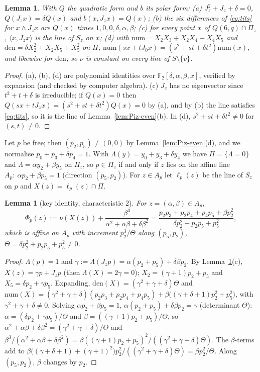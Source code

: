 \documentclass[11pt]{amsart}
\newtheorem{lemma}[theorem]{Lemma}
\theoremstyle{definition}
\theoremstyle{remark}
\numberwithin{equation}{section}
\newcommand{\F}{\mathbb F}
\begin{document}
\begin{lemma}\label{lem:Jz-even}
With $Q$ the quadratic form and $b$ its polar form: (a) $J_z^2+J_z+\delta=0$, $Q(J_zx)=\delta Q(x)$ and $b(x,J_zx)=Q(x)$;
(b) the six differences of \eqref{eq:tits} for $x\wedge J_zx$ are $Q(x)$ times $1,0,0,\delta,\alpha,\beta$; (c) for every
point $x$ of $Q(6,q)\cap\Pi_z$, $\langle x,J_zx\rangle$ is the line of $S_z$ on $x$; (d) with
$\mathrm{num}=X_2X_3+X_2X_4+X_4X_5$ and $\mathrm{den}=\delta X_2^2+X_2X_5+X_5^2$ on $\Pi$,
$\mathrm{num}(sx+tJ_0x)=(s^2+st+\delta t^2)\mathrm{num}(x)$, and likewise for $\mathrm{den}$; so $\nu$ is constant on every
line of $S\setminus\{v\}$.
\end{lemma}

\begin{proof}
(a), (b), (d) are polynomial identities over $\F_2[\delta,\alpha,\beta,x]$, verified by expansion (and checked by computer
algebra). (c) $J_z$ has no
eigenvector since $t^2+t+\delta$ is irreducible; if $Q(x)=0$ then $Q(sx+tJ_zx)=(s^2+st+\delta t^2)Q(x)=0$ by (a), and by (b)
the line satisfies \eqref{eq:tits}, so it is the line of Lemma~\ref{lem:Piz-even}(b). In (d), $s^2+st+\delta t^2\ne0$ for
$(s,t)\ne0$.
\end{proof}

Let $p$ be free; then $(p_2,p_5)\ne(0,0)$ by Lemma~\ref{lem:Piz-even}(d), and we normalise $p_0+p_3+\delta p_4=1$. With
$\Lambda(y)=y_0+y_3+\delta y_4$ we have $\Pi=\{\Lambda=0\}$ and $\Lambda=\alpha y_2+\beta y_5$ on $\Pi_z$, so $p\in\Pi_z$ if and
only if $z$ lies on the affine line $A_p:\ \alpha p_2+\beta p_5=1$ (direction $(p_5,p_2)$). For $z\in A_p$ let $\ell_p(z)$ be
the line of $S_z$ on $p$ and $X(z)=\ell_p(z)\cap\Pi$.

\begin{lemma}[key identity, characteristic 2]\label{lem:key-even}
For $z=(\alpha,\beta)\in A_p$,
\[
\Phi_p(z):=\nu(X(z))+\frac{\beta^3}{\alpha^2+\alpha\beta+\delta\beta^2}=\frac{p_2p_3+p_2p_4+p_4p_5+\beta
p_2^2}{\delta p_2^2+p_2p_5+p_5^2},
\]
which is affine on $A_p$ with increment $p_2^3/\Theta$ along $(p_5,p_2)$, $\Theta=\delta p_2^2+p_2p_5+p_5^2\ne0$.
\end{lemma}

\begin{proof}
$\Lambda(p)=1$ and $\gamma:=\Lambda(J_zp)=\alpha(p_2+p_5)+\delta\beta p_2$. By Lemma~\ref{lem:Jz-even}(c), $X(z)=\gamma p+J_zp$
(then $\Lambda(X)=2\gamma=0$); $X_2=(\gamma+1)p_2+p_5$ and $X_5=\delta p_2+\gamma p_5$. Expanding,
$\mathrm{den}(X)=(\gamma^2+\gamma+\delta)\Theta$ and
$\mathrm{num}(X)=(\gamma^2+\gamma+\delta)(p_2p_3+p_2p_4+p_4p_5)+\beta\bigl((\gamma+\delta+1)p_2^2+p_5^2\bigr)$, with
$\gamma^2+\gamma+\delta\ne0$. Solving $\alpha p_2+\beta p_5=1$, $\alpha(p_2+p_5)+\delta\beta p_2=\gamma$ (determinant $\Theta$):
$\alpha=(\delta p_2+\gamma p_5)/\Theta$ and $\beta=((\gamma+1)p_2+p_5)/\Theta$, so
$\alpha^2+\alpha\beta+\delta\beta^2=(\gamma^2+\gamma+\delta)/\Theta$ and
$\beta^3/(\alpha^2+\alpha\beta+\delta\beta^2)=\beta((\gamma+1)p_2+p_5)^2/((\gamma^2+\gamma+\delta)\Theta)$. The $\beta$-terms add to
$\beta\bigl((\gamma+\delta+1)+(\gamma+1)^2\bigr)p_2^2/((\gamma^2+\gamma+\delta)\Theta)=\beta p_2^2/\Theta$. Along $(p_5,p_2)$,
$\beta$ changes by $p_2$.
\end{proof}
\end{document}

